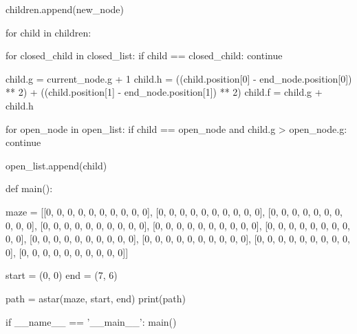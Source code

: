 \begin{python}
            children.append(new_node)

        for child in children:

            for closed_child in closed_list:
                if child == closed_child:
                    continue

            child.g = current_node.g + 1
            child.h = ((child.position[0] - end_node.position[0]) ** 2) + ((child.position[1] - end_node.position[1]) ** 2)
            child.f = child.g + child.h

            for open_node in open_list:
                if child == open_node and child.g > open_node.g:
                    continue

            open_list.append(child)


def main():

    maze = [[0, 0, 0, 0, 0, 0, 0, 0, 0, 0],
            [0, 0, 0, 0, 0, 0, 0, 0, 0, 0],
            [0, 0, 0, 0, 0, 0, 0, 0, 0, 0],
            [0, 0, 0, 0, 0, 0, 0, 0, 0, 0],
            [0, 0, 0, 0, 0, 0, 0, 0, 0, 0],
            [0, 0, 0, 0, 0, 0, 0, 0, 0, 0],
            [0, 0, 0, 0, 0, 0, 0, 0, 0, 0],
            [0, 0, 0, 0, 0, 0, 0, 0, 0, 0],
            [0, 0, 0, 0, 0, 0, 0, 0, 0, 0],
            [0, 0, 0, 0, 0, 0, 0, 0, 0, 0]]

    start = (0, 0)
    end = (7, 6)

    path = astar(maze, start, end)
    print(path)


if __name__ == '__main__':
    main()

\end{python}



